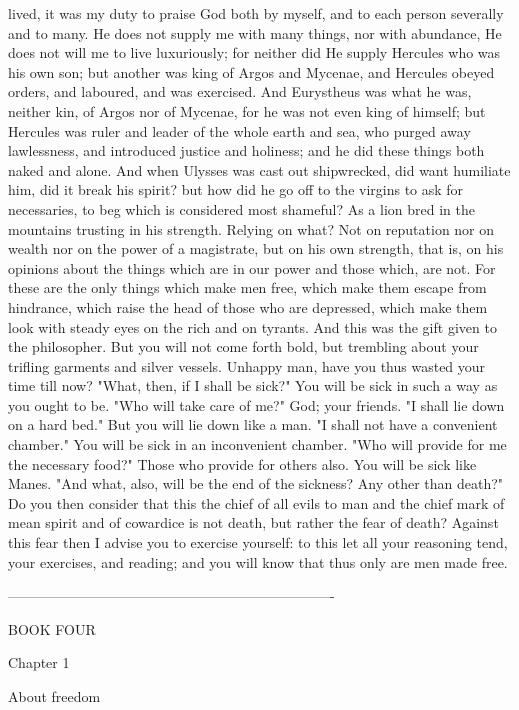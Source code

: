 \documentclass[a4paper]{article}
\begin{document}
lived, it was my duty to praise God both by myself, and to each person
severally and to many. He does not supply me with many things, nor with
abundance, He does not will me to live luxuriously; for neither did He supply
Hercules who was his own son; but another was king of Argos and Mycenae, and
Hercules obeyed orders, and laboured, and was exercised. And Eurystheus was
what he was, neither kin, of Argos nor of Mycenae, for he was not even king of
himself; but Hercules was ruler and leader of the whole earth and sea, who
purged away lawlessness, and introduced justice and holiness; and he did these
things both naked and alone. And when Ulysses was cast out shipwrecked, did
want humiliate him, did it break his spirit? but how did he go off to the
virgins to ask for necessaries, to beg which is considered most shameful?
       As a lion bred in the mountains trusting in his strength.
    Relying on what? Not on reputation nor on wealth nor on the power of a
magistrate, but on his own strength, that is, on his opinions about the things
which are in our power and those which, are not. For these are the only things
which make men free, which make them escape from hindrance, which raise the
head of those who are depressed, which make them look with steady eyes on the
rich and on tyrants. And this was the gift given to the philosopher. But you
will not come forth bold, but trembling about your trifling garments and silver
vessels. Unhappy man, have you thus wasted your time till now?
    "What, then, if I shall be sick?" You will be sick in such a way as you
ought to be. "Who will take care of me?" God; your friends. "I shall lie down
on a hard bed." But you will lie down like a man. "I shall not have a
convenient chamber." You will be sick in an inconvenient chamber. "Who will
provide for me the necessary food?" Those who provide for others also. You will
be sick like Manes. "And what, also, will be the end of the sickness? Any other
than death?" Do you then consider that this the chief of all evils to man and
the chief mark of mean spirit and of cowardice is not death, but rather the
fear of death? Against this fear then I advise you to exercise yourself: to
this let all your reasoning tend, your exercises, and reading; and you will
know that thus only are men made free.

----------------------------------------------------------------------

BOOK FOUR

Chapter 1

About freedom
\end{document}
